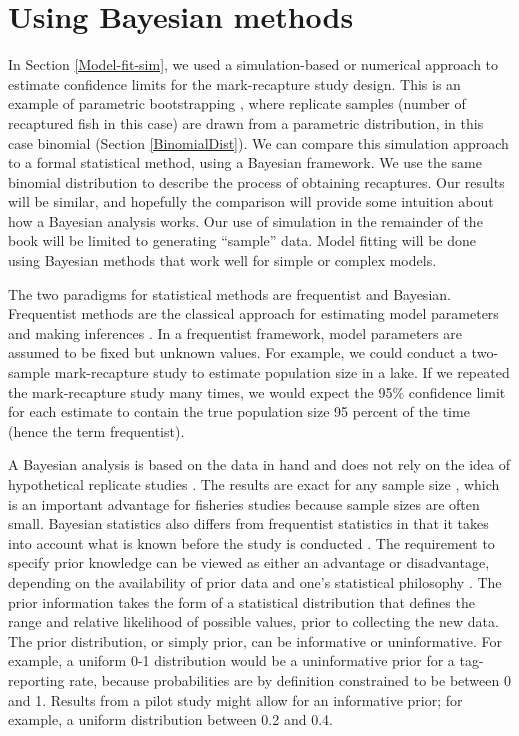 \documentclass[
]{krantz}
\begin{document}
\hypertarget{JAGS-model-fit}{%
\section{Using Bayesian methods}\label{JAGS-model-fit}}

In Section \ref{Model-fit-sim}, we used a simulation-based or numerical approach to estimate confidence limits for the mark-recapture study design. This is an example of parametric bootstrapping \citep{efron.tibshirani_1993}, where replicate samples (number of recaptured fish in this case) are drawn from a parametric distribution, in this case binomial (Section \ref{BinomialDist}). We can compare this simulation approach to a formal statistical method, using a Bayesian framework. We use the same binomial distribution to describe the process of obtaining recaptures. Our results will be similar, and hopefully the comparison will provide some intuition about how a Bayesian analysis works. Our use of simulation in the remainder of the book will be limited to generating ``sample'' data. Model fitting will be done using Bayesian methods that work well for simple or complex models.

The two paradigms for statistical methods are frequentist and Bayesian. Frequentist methods are the classical approach for estimating model parameters and making inferences \citep{link.etal_2002, royle.dorazio_2009}. In a frequentist framework, model parameters are assumed to be fixed but unknown values. For example, we could conduct a two-sample mark-recapture study to estimate population size in a lake. If we repeated the mark-recapture study many times, we would expect the 95\% confidence limit for each estimate to contain the true population size 95 percent of the time (hence the term frequentist).

A Bayesian analysis is based on the data in hand and does not rely on the idea of hypothetical replicate studies \citep{mccarthy2007, royle.dorazio_2009}. The results are exact for any sample size \citep{kéry.schaub_2011}, which is an important advantage for fisheries studies because sample sizes are often small. Bayesian statistics also differs from frequentist statistics in that it takes into account what is known before the study is conducted \citep{mccarthy2007}. The requirement to specify prior knowledge can be viewed as either an advantage or disadvantage, depending on the availability of prior data and one's statistical philosophy \citep{ellison_2004, mccarthy2007, kéry_2010, kéry.schaub_2011, dorazio_2016, doll.jacquemin_2018, banner.etal_2020}. The prior information takes the form of a statistical distribution that defines the range and relative likelihood of possible values, prior to collecting the new data. The prior distribution, or simply prior, can be informative or uninformative. For example, a uniform 0-1 distribution would be a uninformative prior for a tag-reporting rate, because probabilities are by definition constrained to be between 0 and 1. Results from a pilot study might allow for an informative prior; for example, a uniform distribution between 0.2 and 0.4.
\end{document}
